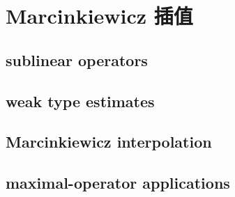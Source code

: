 \section{Marcinkiewicz 插值}
\label{b2:sec:1703}


\subsection{sublinear operators}
\label{b2:subsec:170301}

\subsection{weak type estimates}
\label{b2:subsec:170302}

\subsection{Marcinkiewicz interpolation}
\label{b2:subsec:170303}

\subsection{maximal-operator applications}
\label{b2:subsec:170304}


